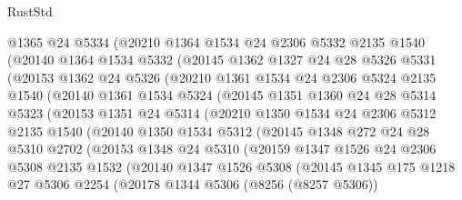 \begin{lexlean}{RustStd}
\begin{coremodule}
{\begin{coremodule}
{{{{{{{{{{{{{{{{{{{{{{{{{{{{{{{{{{      @1365
      @24
      @5334
      (@20210
        @1364
        @1534
        @24
        @2306
        @5332
        @2135
        @1540
        (@20140
          @1364
          @1534
          @5332
          (@20145
            @1362
            @1327
            @24
            @28
            @5326
            @5331
            (@20153
              @1362
              @24
              @5326
              (@20210
                @1361
                @1534
                @24
                @2306
                @5324
                @2135
                @1540
                (@20140
                  @1361
                  @1534
                  @5324
                  (@20145
                    @1351
                    @1360
                    @24
                    @28
                    @5314
                    @5323
                    (@20153
                      @1351
                      @24
                      @5314
                      (@20210
                        @1350
                        @1534
                        @24
                        @2306
                        @5312
                        @2135
                        @1540
                        (@20140
                          @1350
                          @1534
                          @5312
                          (@20145
                            @1348
                            @272
                            @24
                            @28
                            @5310
                            @2702
                            (@20153
                              @1348
                              @24
                              @5310
                              (@20159
                                @1347
                                @1526
                                @24
                                @2306
                                @5308
                                @2135
                                @1532
                                (@20140
                                  @1347
                                  @1526
                                  @5308
                                  (@20145
                                    @1345
                                    @175
                                    @1218
                                    @27
                                    @5306
                                    @2254
                                    (@20178
                                      @1344
                                      @5306
                                      (@8256 (@8257 @5306))
}}}}}}}}}}}}}}}}}}}}}}}}}}}}}}}}}}
\end{coremodule}}
\end{coremodule}
\end{lexlean}
